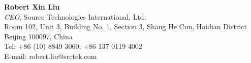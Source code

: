 \documentclass[letterpaper,11pt]{article}
\newcommand{\resheading}[1]{{\noindent\large \colorbox{mygrey}{
\begin{minipage}{1.0\textwidth}{\textsc{#1 \vphantom{p\^{E}}}}\end{minipage}}}}
\begin{document}
\begin{CJK}{UTF8}{gbsn}
\vspace{0.2in}%
\textbf{Robert Xin Liu}\\
\textit{CEO}, Source Technologies International, Ltd.\\
Room 102, Unit 3, Building No. 1, Section 3, Shang He Cun, Haidian District\\
Beijing 100097, China\\
Tel: +86 (10) 8849 3060; +86 137 0119 4002\\
E-mail: robert.liu@srctek.com\\



%
%










\end{CJK}
\end{document}
